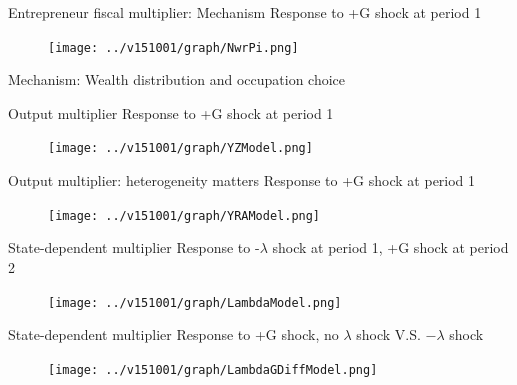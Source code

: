 \documentclass[svgnames]{beamer}
\begin{document}
\begin{frame}{Entrepreneur fiscal multiplier: Mechanism}
{Response to +G shock at period 1}
\begin{figure}[!ht]
\texttt{[image: ../v151001/graph/NwrPi.png]}
\end{figure}
\end{frame}


\begin{frame}{Mechanism: Wealth distribution and occupation choice}
  \begin{center} 
  \end{center}
\end{frame}

\begin{frame}{Output multiplier}
{Response to +G shock at period 1}
\begin{figure}[!ht]
\texttt{[image: ../v151001/graph/YZModel.png]}
\end{figure}
\citet{zeev_effects_2014}
\end{frame}

\begin{frame}{Output multiplier: heterogeneity matters}
{Response to +G shock at period 1}
\begin{figure}[!ht]
\texttt{[image: ../v151001/graph/YRAModel.png]}
\end{figure}
\end{frame}

\begin{frame}{State-dependent multiplier}
{Response to -$\lambda$ shock at period 1, +G shock at period 2}
\begin{figure}[!ht]
\texttt{[image: ../v151001/graph/LambdaModel.png]}
\end{figure}
\end{frame}

\begin{frame}{State-dependent multiplier}
{Response to +G shock, no $\lambda$ shock V.S. $-\lambda$ shock}
\begin{figure}[!ht]
\texttt{[image: ../v151001/graph/LambdaGDiffModel.png]}
\end{figure}
\end{frame}
\end{document}
